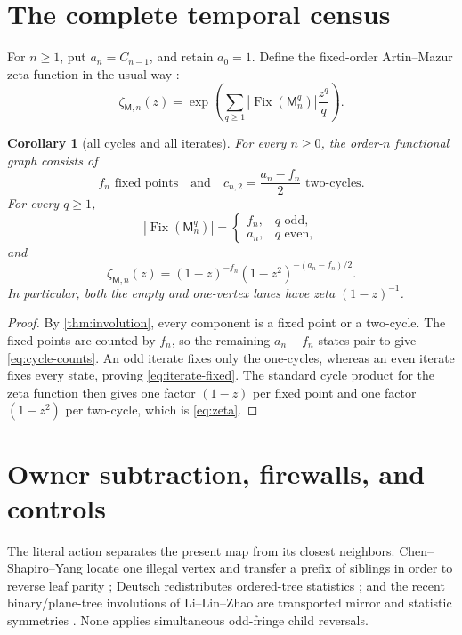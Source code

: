 \documentclass[10pt,a4paper]{amsart}
\newtheorem{corollary}[theorem]{Corollary}
\theoremstyle{definition}
\theoremstyle{remark}
\newcommand{\Fix}{\operatorname{Fix}}
\newcommand{\M}{\mathsf M}
\begin{document}
\section{The complete temporal census}\label{sec:census}

For $n\geq1$, put $a_n=C_{n-1}$, and retain $a_0=1$.  Define the fixed-order
Artin--Mazur zeta function in the usual way \cite{ArtinMazur1965}:
\[
 \zeta_{\M,n}(z)
 =\exp\left(\sum_{q\geq1}
       |\Fix(\M_n^q)|\frac{z^q}{q}\right).
\]

\begin{corollary}[all cycles and all iterates]\label{cor:census}
For every $n\geq0$, the order-$n$ functional graph consists of
\begin{equation}\label{eq:cycle-counts}
       f_n\text{ fixed points}
       \quad\text{and}\quad
       c_{n,2}=\frac{a_n-f_n}{2}\text{ two-cycles}.
\end{equation}
For every $q\geq1$,
\begin{equation}\label{eq:iterate-fixed}
 |\Fix(\M_n^q)|=
 \begin{cases}
 f_n,&q\text{ odd},\\
 a_n,&q\text{ even},
 \end{cases}
\end{equation}
and
\begin{equation}\label{eq:zeta}
 \boxed{\displaystyle
 \zeta_{\M,n}(z)
 =(1-z)^{-f_n}(1-z^2)^{-(a_n-f_n)/2}.}
\end{equation}
In particular, both the empty and one-vertex lanes have zeta
$(1-z)^{-1}$.
\end{corollary}

\begin{proof}
By \cref{thm:involution}, every component is a fixed point or a two-cycle.
The fixed points are counted by $f_n$, so the remaining $a_n-f_n$ states
pair to give \eqref{eq:cycle-counts}.  An odd iterate fixes only the
one-cycles, whereas an even iterate fixes every state, proving
\eqref{eq:iterate-fixed}.  The standard cycle product for the zeta function
then gives one factor $(1-z)$ per fixed point and one factor $(1-z^2)$ per
two-cycle, which is \eqref{eq:zeta}.
\end{proof}

\section{Owner subtraction, firewalls, and controls}\label{sec:scope}

The literal action separates the present map from its closest neighbors.
Chen--Shapiro--Yang locate one illegal vertex and transfer a prefix of
siblings in order to reverse leaf parity \cite{ChenShapiroYang2006}; Deutsch
redistributes ordered-tree statistics \cite{Deutsch2000}; and the recent
binary/plane-tree involutions of Li--Lin--Zhao are transported mirror and
statistic symmetries \cite{LiLinZhao2024}.  None applies simultaneous
odd-fringe child reversals.
\end{document}
